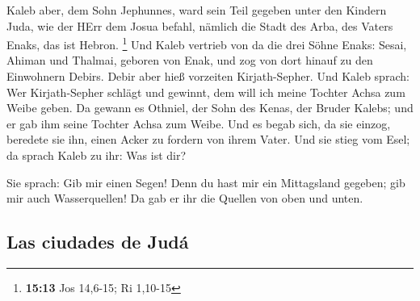  Kaleb aber, dem Sohn Jephunnes, ward sein Teil gegeben
unter den Kindern Juda, wie der HErr dem Josua befahl, nämlich die Stadt
des Arba, des Vaters Enaks, das ist Hebron. \footnote{\textbf{15:13} Jos
  14,6-15; Ri 1,10-15}  Und Kaleb vertrieb von da die
drei Söhne Enaks: Sesai, Ahiman und Thalmai, geboren von Enak,
 und zog von dort hinauf zu den Einwohnern Debirs. Debir
aber hieß vorzeiten Kirjath-Sepher.  Und Kaleb sprach:
Wer Kirjath-Sepher schlägt und gewinnt, dem will ich meine Tochter Achsa
zum Weibe geben.  Da gewann es Othniel, der Sohn des
Kenas, der Bruder Kalebs; und er gab ihm seine Tochter Achsa zum Weibe.
 Und es begab sich, da sie einzog, beredete sie ihn,
einen Acker zu fordern von ihrem Vater. Und sie stieg vom Esel; da
sprach Kaleb zu ihr: Was ist dir?

 Sie sprach: Gib mir einen Segen! Denn du hast mir ein
Mittagsland gegeben; gib mir auch Wasserquellen! Da gab er ihr die
Quellen von oben und unten.

\hypertarget{las-ciudades-de-juduxe1}{%
\subsection{Las ciudades de Judá}\label{las-ciudades-de-juduxe1}}

